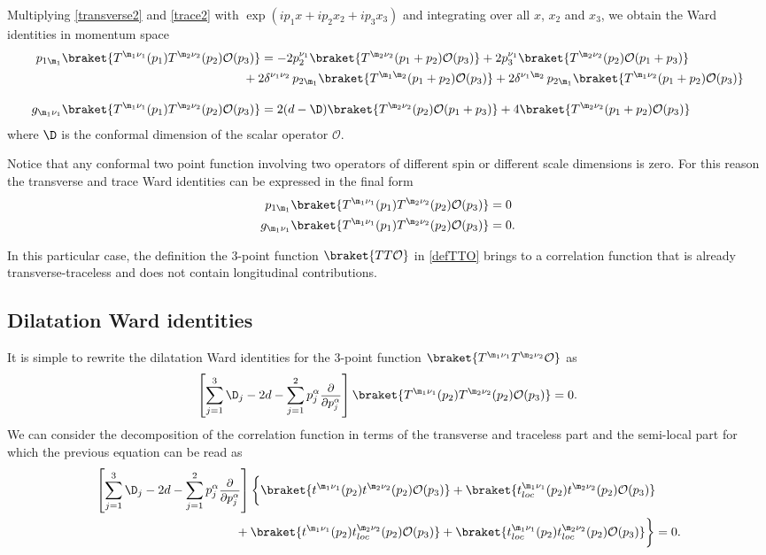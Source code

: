 \documentclass[a4paper,11pt,openright,twoside]{book}
\newcommand{\mO}{\mathcal{O}}
\let\a=\alpha   \let\b=\beta   \let\g=\gamma   \let\d=\delta
\let\n=\nu      \let\x=\xi     \let\p=\pi      \let\r=\rho
\newcommand{\sdfrac}[2]{\mbox{\small$\displaystyle\frac{#1}{#2}$}}
\numberwithin{equation}{section}
\begin{document}
{{Multiplying \eqref{transverse2} and \eqref{trace2} with $\exp(ip_1x+ip_2x_2+ip_3x_3)$ and integrating over all $x$, $x_2$ and $x_3$, we obtain the Ward identities in momentum space
\begin{align}
	p_{1\m_1}\braket{T^{\m_1\n_1}(p_1)T^{\m_2\n_2}(p_2)\mO(p_3)}&=-2p_2^{\n_1}\braket{T^{\m_2\n_2}(p_1+p_2)\mO(p_3)}+2p_3^{\n_1}\braket{T^{\m_2\n_2}(p_2)\mO(p_1+p_3)}\notag\\
	&\hspace{-0.5cm}+2\d^{\n_1\n_2}\,p_{2\m_1}\braket{T^{\m_1\m_2}(p_1+p_2)\mO(p_3)}+2\d^{\n_1\m_2}\,p_{2\m_1}\braket{T^{\m_1\n_2}(p_1+p_2)\mO(p_3)}\\[2ex]
	g_{\m_1\n_1}\braket{T^{\m_1\n_1}(p_1)T^{\m_2\n_2}(p_2)\mO(p_3)}&=2(d-\D)\braket{T^{\m_2\n_2}(p_2)\mO(p_1+p_3)}+4\braket{T^{\m_2\n_2}(p_1+p_2)\mO(p_3)}
\end{align}
where $\D$ is the conformal dimension of the scalar operator $\mO$. 

Notice that any conformal two point function involving two operators of different spin or different scale dimensions is zero. For this reason the transverse and trace Ward identities can be expressed in the final form
\begin{equation}
	\begin{split}
		p_{1\m_1}\braket{T^{\m_1\n_1}(p_1)T^{\m_2\n_2}(p_2)\mO(p_3)}&=0\\
		g_{\m_1\n_1}\braket{T^{\m_1\n_1}(p_1)T^{\m_2\n_2}(p_2)\mO(p_3)}&=0.
	\end{split}\label{finWardTTO}
\end{equation}

In this particular case, the definition the 3-point function $\braket{TT\mO}$ in \eqref{defTTO} brings to a correlation function that is already transverse-traceless and does not contain longitudinal contributions. 

\subsection{Dilatation Ward identities}

It is simple to rewrite the dilatation Ward identities for the 3-point function $\braket{T^{\m_1\n_1}T^{\m_2\n_2}\mO}$ as
\begin{equation}
	\left[\sum_{j=1}^3\D_j-2d-\sum_{j=1}^{2}p_j^\a\sdfrac{\partial}{\partial p_j^\a}\right]\braket{T^{\m_1\n_1}(p_2)T^{\m_2\n_2}(p_2)\mO(p_3)}=0.\label{dilorig}
\end{equation}
We can consider the decomposition of the correlation function in terms of the transverse and traceless part and the semi-local part for which the previous equation can be read as
\begin{align}
	&\left[\sum_{j=1}^3\D_j-2d-\sum_{j=1}^{2}p_j^\a\sdfrac{\partial}{\partial p_j^\a}\right]\bigg\{\braket{t^{\m_1\n_1}(p_2)t^{\m_2\n_2}(p_2)\mO(p_3)}+\braket{t_{loc}^{\m_1\n_1}(p_2)t^{\m_2\n_2}(p_2)\mO(p_3)}\notag\\
	&\hspace{4cm}+\braket{t^{\m_1\n_1}(p_2)t_{loc}^{\m_2\n_2}(p_2)\mO(p_3)}+\braket{t_{loc}^{\m_1\n_1}(p_2)t_{loc}^{\m_2\n_2}(p_2)\mO(p_3)}\bigg\}=0.\label{dildec}
\end{align}

}}
\end{document}
